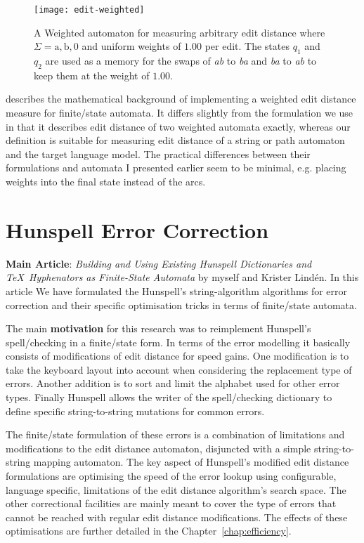 \documentclass[officiallayout]{unihelcompling}
\begin{document}
\begin{figure}
    \texttt{[image: edit-weighted]}
    \caption{A Weighted automaton for measuring arbitrary edit distance where
        $\Sigma = {\mathrm{a}, \mathrm{b}, 0}$ and uniform weights of $1.00$ per
        edit. The states $q_1$ and $q_2$ are used as a memory for
        the swaps of \emph{ab} to \emph{ba} and \emph{ba} to \emph{ab} to
        keep them at the weight of $1.00$. \label{fig:edit-weighted}}
\end{figure}

\citet{mohri2003edit} describes the mathematical background of implementing a
weighted edit distance measure for finite\-/state automata. It differs slightly
from the formulation we use in that it describes edit distance of two weighted
automata exactly, whereas our definition is suitable for measuring edit
distance of a string or path automaton and the target language model. The
practical differences between their formulations and automata I presented
earlier seem to be minimal, e.g. placing weights into the final state instead
of the arcs.

\section{Hunspell Error Correction}
\label{sec:Hunspell-error}

\textbf{Main Article}: \emph{Building and Using Existing Hunspell Dictionaries
and \TeX\ Hyphenators as Finite-State Automata} by myself and Krister Lindén.
In this article We have formulated the Hunspell's string-algorithm algorithms for
error correction and their specific optimisation tricks in terms of
finite\-/state automata.

The main \textbf{motivation} for this research was to reimplement Hunspell's
spell\-/checking in a finite\-/state form. In terms of the  error modelling it
basically consists of modifications of edit distance for speed gains. 
One modification is to take the keyboard layout
into account when considering the replacement type of errors. Another addition
is to sort and limit the alphabet used for other error types. Finally Hunspell
allows the writer of the spell\-/checking dictionary to define specific
string-to-string mutations for common errors.

The finite\-/state formulation of these errors is a combination of limitations
and modifications to the edit distance automaton, disjuncted with a simple
string-to-string mapping automaton. The key aspect of Hunspell's modified
edit distance formulations are optimising the speed of the error lookup using
configurable, language specific, limitations of the edit distance algorithm's
search space. The other correctional facilities are mainly meant to cover the
type of errors that cannot be reached with regular edit distance modifications.
The effects of these optimisations are further detailed in the 
Chapter~\ref{chap:efficiency}.
\end{document}
